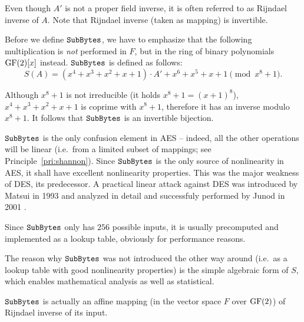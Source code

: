 	\begin{note}
	\label{note:rijinv}
		Even though $A'$ is not a proper field inverse, it is often referred to as {Rijndael inverse} of $A$. Note that Rijndael inverse (taken as mapping) is invertible.
	\end{note}
	
	Before we define $\texttt{SubBytes}$, we have to emphasize that the following multiplication is {\em not} performed in $F$, but in the ring of binary polynomials $\mathrm{GF}(2)[x]$ instead. $\texttt{SubBytes}$ is defined as follows:
	\newcommand{\defsbox}{S(A) = (x^4 + x^3 + x^2 + x + 1) \cdot A' + x^6 + x^5 + x + 1 \pmod{x^8+1}}
	\begin{equation}
	\label{eq:sbox}
		\defsbox .
	\end{equation}
	
	\begin{note}
	\label{note:sboxinv}
		Although $x^8+1$ is not irreducible (it holds $x^8+1 = (x+1)^8$), $x^4 + x^3 + x^2 + x + 1$ is coprime with $x^8+1$, therefore it has an inverse modulo $x^8+1$. It follows that $\texttt{SubBytes}$ is an invertible bijection.
	\end{note}
	
	$\texttt{SubBytes}$ is the only confusion element in AES -- indeed, all the other operations will be linear (i.e.\ from a limited subset of mappings; see Principle~\ref{pri:shannon}). Since $\texttt{SubBytes}$ is the only source of nonlinearity in AES, it shall have excellent nonlinearity properties. This was the major weakness of DES, its predecessor. A practical linear attack against DES was introduced by Matsui \cite{matsui1993linear} in 1993 and analyzed in detail and successfuly performed by Junod in 2001 \cite{junod2001complexity}.
	
	\begin{remark}
	\label{rem:sboxtable}
		Since $\texttt{SubBytes}$ only has $256$ possible inputs, it is usually precomputed and implemented as a lookup table, obviously for performance reasons.
	\end{remark}
	
	The reason why $\texttt{SubBytes}$ was not introduced the other way around (i.e.\ as a lookup table with good nonlinearity properties) is the simple algebraic form of $S$, which enables mathematical analysis as well as statistical.
	
	\begin{remark}
	\label{rem:sboxaff}
		$\texttt{SubBytes}$ is actually an affine mapping (in the vector space $F$ over $\mathrm{GF}(2)$) of Rijndael inverse of its input.
	\end{remark}

